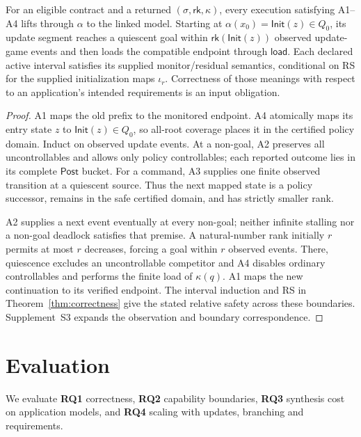 \documentclass[acmsmall,screen,review,anonymous]{acmart}
\newcommand{\Post}{\mathsf{Post}}
\newcommand{\rank}{\mathsf{rk}}
\newcommand{\Init}{\mathsf{Init}}
\begin{document}
\begin{theorem}
\label{thm:realization}
For an eligible contract and a returned $(\sigma,\rank,\kappa)$, every execution satisfying A1--A4 lifts through $\alpha$ to the linked model. Starting at $\alpha(x_0)=\Init(z)\in Q_0$, its update segment reaches a quiescent goal within $\rank(\Init(z))$ observed update-game events and then loads the compatible endpoint through $\mathsf{load}$. Each declared active interval satisfies its supplied monitor/residual semantics, conditional on RS for the supplied initialization maps $\iota_r$. Correctness of those meanings with respect to an application's intended requirements is an input obligation.
\end{theorem}
\begin{proof}
A1 maps the old prefix to the monitored endpoint. A4 atomically maps its entry state $z$ to $\Init(z)\in Q_0$, so all-root coverage places it in the certified policy domain. Induct on observed update events. At a non-goal, A2 preserves all uncontrollables and allows only policy controllables; each reported outcome lies in its complete $\Post$ bucket. For a command, A3 supplies one finite observed transition at a quiescent source. Thus the next mapped state is a policy successor, remains in the safe certified domain, and has strictly smaller rank.

A2 supplies a next event eventually at every non-goal; neither infinite stalling nor a non-goal deadlock satisfies that premise. A natural-number rank initially $r$ permits at most $r$ decreases, forcing a goal within $r$ observed events. There, quiescence excludes an uncontrollable competitor and A4 disables ordinary controllables and performs the finite load of $\kappa(q)$. A1 maps the new continuation to its verified endpoint. The interval induction and RS in Theorem~\ref{thm:correctness} give the stated relative safety across these boundaries. Supplement~S3 expands the observation and boundary correspondence.
\end{proof}

\section{Evaluation}
\label{sec:evaluation}
We evaluate \textbf{RQ1} correctness, \textbf{RQ2} capability boundaries, \textbf{RQ3} synthesis cost on application models, and \textbf{RQ4} scaling with updates, branching and requirements.
\end{document}
